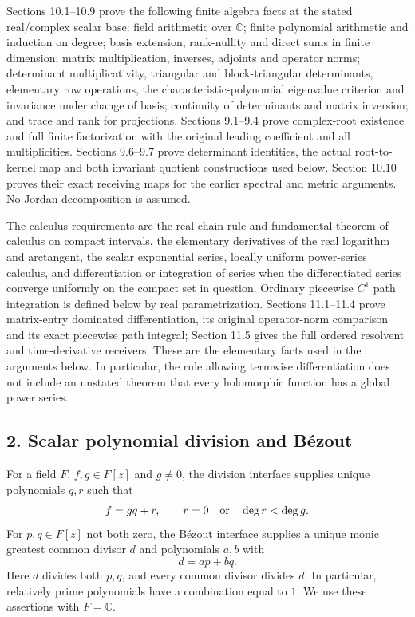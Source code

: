 \documentclass[
  11pt,
]{article}
\begin{document}
Sections 10.1--10.9 prove the following finite algebra facts at the
stated real/complex scalar base: field arithmetic over \(\mathbb C\);
finite polynomial arithmetic and induction on degree; basis extension,
rank-nullity and direct sums in finite dimension; matrix multiplication,
inverses, adjoints and operator norms; determinant multiplicativity,
triangular and block-triangular determinants, elementary row operations,
the characteristic-polynomial eigenvalue criterion and invariance under
change of basis; continuity of determinants and matrix inversion; and
trace and rank for projections. Sections 9.1--9.4 prove complex-root
existence and full finite factorization with the original leading
coefficient and all multiplicities. Sections 9.6--9.7 prove determinant
identities, the actual root-to-kernel map and both invariant quotient
constructions used below. Section 10.10 proves their exact receiving
maps for the earlier spectral and metric arguments. No Jordan
decomposition is assumed.

The calculus requirements are the real chain rule and fundamental
theorem of calculus on compact intervals, the elementary derivatives of
the real logarithm and arctangent, the scalar exponential series,
locally uniform power-series calculus, and differentiation or
integration of series when the differentiated series converge uniformly
on the compact set in question. Ordinary piecewise \(C^1\) path
integration is defined below by real parametrization. Sections
11.1--11.4 prove matrix-entry dominated differentiation, its original
operator-norm comparison and its exact piecewise path integral; Section
11.5 gives the full ordered resolvent and time-derivative receivers.
These are the elementary facts used in the arguments below. In
particular, the rule allowing termwise differentiation does not include
an unstated theorem that every holomorphic function has a global power
series.

\subsection{2. Scalar polynomial division and
Bézout}\label{scalar-polynomial-division-and-buxe9zout}

For a field \(F\), \(f,g\in F[z]\) and \(g\ne0\), the division interface
supplies unique polynomials \(q,r\) such that \[
f=gq+r,\qquad r=0\quad\hbox{or}\quad\deg r<\deg g.
\] For \(p,q\in F[z]\) not both zero, the Bézout interface supplies a
unique monic greatest common divisor \(d\) and polynomials \(a,b\) with
\[
d=ap+bq.
\] Here \(d\) divides both \(p,q\), and every common divisor divides
\(d\). In particular, relatively prime polynomials have a combination
equal to \(1\). We use these assertions with \(F=\mathbb C\).
\end{document}
